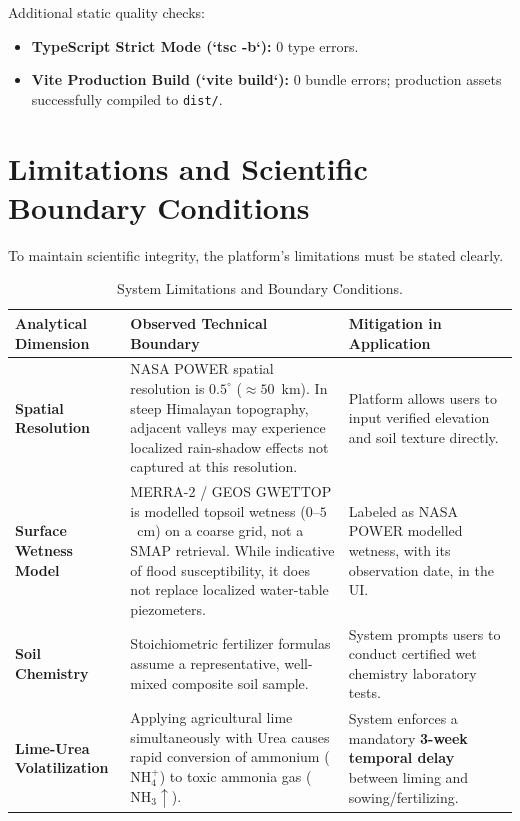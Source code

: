 \documentclass[11pt,a4paper]{report}
\begin{document}
Additional static quality checks:
\begin{itemize}
  \item \textbf{TypeScript Strict Mode (`tsc -b`):} 0 type errors.
  \item \textbf{Vite Production Build (`vite build`):} 0 bundle errors; production assets successfully compiled to \texttt{dist/}.
\end{itemize}

\chapter{Limitations and Scientific Boundary Conditions}

To maintain scientific integrity, the platform's limitations must be stated clearly.

\begin{table}[htbp]
\centering
\small
\caption{System Limitations and Boundary Conditions.}
\label{tab:limitations}
\begin{tabularx}{\textwidth}{p{3.5cm}Xp{4.2cm}}
\toprule
\textbf{Analytical Dimension} & \textbf{Observed Technical Boundary} & \textbf{Mitigation in Application} \\
\midrule
\textbf{Spatial Resolution} & NASA POWER spatial resolution is $0.5^\circ$ ($\approx 50$~km). In steep Himalayan topography, adjacent valleys may experience localized rain-shadow effects not captured at this resolution. & Platform allows users to input verified elevation and soil texture directly. \\
\textbf{Surface Wetness Model} & MERRA-2 / GEOS $\text{GWETTOP}$ is modelled topsoil wetness ($0$--$5$~cm) on a coarse grid, not a SMAP retrieval. While indicative of flood susceptibility, it does not replace localized water-table piezometers. & Labeled as NASA POWER modelled wetness, with its observation date, in the UI. \\
\textbf{Soil Chemistry} & Stoichiometric fertilizer formulas assume a representative, well-mixed composite soil sample. & System prompts users to conduct certified wet chemistry laboratory tests. \\
\textbf{Lime-Urea Volatilization} & Applying agricultural lime simultaneously with Urea causes rapid conversion of ammonium ($\text{NH}_4^+$) to toxic ammonia gas ($\text{NH}_3\uparrow$). & System enforces a mandatory \textbf{3-week temporal delay} between liming and sowing/fertilizing. \\
\bottomrule
\end{tabularx}
\end{table}
\end{document}
